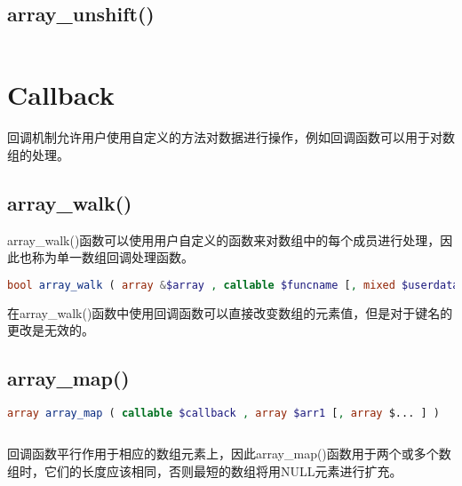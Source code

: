 \begin{lstlisting}[language=PHP]

\end{lstlisting}


\subsection{array\_unshift()}


\begin{lstlisting}[language=PHP]

\end{lstlisting}

\section{Callback}

回调机制允许用户使用自定义的方法对数据进行操作，例如回调函数可以用于对数组的处理。


\subsection{array\_walk()}

array\_walk()函数可以使用用户自定义的函数来对数组中的每个成员进行处理，因此也称为单一数组回调处理函数。



\begin{lstlisting}[language=PHP]
bool array_walk ( array &$array , callable $funcname [, mixed $userdata = NULL ] )
\end{lstlisting}

在array\_walk()函数中使用回调函数可以直接改变数组的元素值，但是对于键名的更改是无效的。


\subsection{array\_map()}



\begin{lstlisting}[language=PHP]
array array_map ( callable $callback , array $arr1 [, array $... ] )
\end{lstlisting}


\begin{lstlisting}[language=PHP]

\end{lstlisting}

回调函数平行作用于相应的数组元素上，因此array\_map()函数用于两个或多个数组时，它们的长度应该相同，否则最短的数组将用NULL元素进行扩充。

